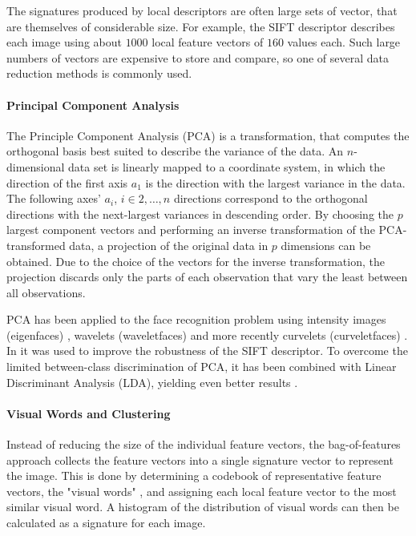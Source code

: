 The signatures produced by local descriptors are often large sets of vector,
that are themselves of considerable size. For example, the SIFT descriptor
describes each image using about $1000$ local feature vectors of $160$ values
each. Such large numbers of vectors are expensive to store and compare, so one
of several data reduction methods is commonly used.

\paragraph{Principal Component Analysis}

The Principle Component Analysis (PCA) is a transformation, that computes the
orthogonal basis best suited to describe the variance of the data. An
$n$-dimensional data set is linearly mapped to a coordinate system, in which
the direction of the first axis $a_1$ is the direction with the largest
variance in the data. The following axes' $a_i$, $i \in 2, \dots, n$ directions
correspond to the orthogonal directions with the next-largest variances in
descending order. By choosing the $p$ largest component vectors and performing
an inverse transformation of the PCA-transformed data, a projection of the
original data in $p$ dimensions can be obtained. Due to the choice of the
vectors for the inverse transformation, the projection discards only the parts
of each observation that vary the least between all observations.

PCA has been applied to the face recognition problem using intensity images
(eigenfaces) \autocite{turk_face_1991}, wavelets (waveletfaces)
\autocite{feng_human_2000} and more recently curvelets (curveletfaces)
\autocite{mandal_face_2008}. In \autocite{ke_pca-sift:_2004} it was used to
improve the robustness of the SIFT \autocite{lowe_object_1999} descriptor. To
overcome the limited between-class discrimination of PCA, it has been combined
with Linear Discriminant Analysis (LDA), yielding even better results
\autocite{mandal_curvelet_2009}.

\paragraph{Visual Words and Clustering}\label{sec:anatomy_clustering}

Instead of reducing the size of the individual feature vectors, the
bag-of-features approach collects the feature vectors into a single signature
vector to represent the image. This is done by determining a codebook of
representative feature vectors, the "visual words" \autocite{sivic_video_2003},
and assigning each local feature vector to the most similar visual word. A
histogram of the distribution of visual words can then be calculated as a
signature for each image.

